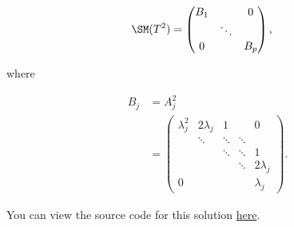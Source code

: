 \documentclass{amsart}
\newcommand{\pagenum}{274}
\newcommand{\probnum}{5}
\begin{document}
\begin{align*}
    \SM(T^2) &= \begin{pmatrix}
        B_1 & & 0 \\
            & \ddots & \\
        0 & & B_p
    \end{pmatrix},
\end{align*}

where

\begin{align*}
    B_j &= A_j^2 \\
        &= \begin{pmatrix}
            \lambda_j^2 & 2\lambda _j & 1 & & 0 \\
                        & \ddots & \ddots & \ddots & \\
                        & & \ddots & \ddots & 1 \\
                        &       & & \ddots & 2\lambda_j \\
            0 & & & & \lambda_j
    \end{pmatrix}.
\end{align*}


\vspace{0.5in}

\begin{note*}
You can view the source code for this solution
\href{https://github.com/thomasbreydo/linalg/blob/main/\pagenum_\probnum_Thomas_Breydo.tex}
{here}.
\end{note*}
\end{document}
